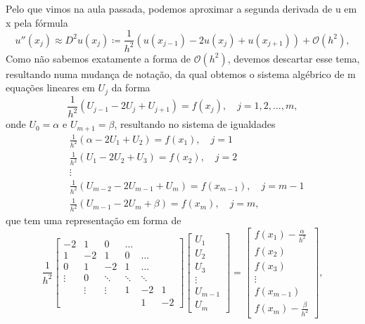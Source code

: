 \documentclass[../differential_methods.tex]{subfiles}
\begin{document}
Pelo que vimos na aula passada, podemos aproximar a segunda derivada de u em x pela fórmula
\[
	u''(x_{j})\approx D^{2}u(x_{j})\coloneqq \frac{1}{h^{2}}(u(x_{j-1})-2u(x_{j})+u(x_{j+1})) + \mathcal{O}(h^{2}),
\]
Como não sabemos exatamente a forma de \(\mathcal{O}(h^{2})\), devemos descartar esse tema, resultando numa mudança de notação, da qual obtemos o sistema algébrico de m equações lineares em \(U_{j}\) da forma
\[
	\frac{1}{h^{2}}(U_{j-1}-2U_{j}+U_{j+1})=f(x_{j}),\quad j=1,2,\dotsc ,m,
\]
onde \(U_{0}=\alpha \) e \(U_{m+1}=\beta \), resultando no sistema de igualdades
\begin{align*}
	 & \frac{1}{h^{2}}(\alpha -2U_1+U_2)=f(x_1), \quad j=1            \\
	 & \frac{1}{h^{2}}(U_1-2U_2+U_3)=f(x_2), \quad j=2                \\
	 & \vdots                                                         \\
	 & \frac{1}{h^{2}}(U_{m-2} -2U_{m-1}+U_m)=f(x_{m-1}), \quad j=m-1 \\
	 & \frac{1}{h^{2}}(U_{m-1} -2U_m+\beta )=f(x_m), \quad j=m,
\end{align*}
que tem uma representação em forma de
\[
	\frac{1}{h^{2}}\begin{bmatrix}
		-2     & 1      & 0      & \dotsc &        &    \\
		1      & -2     & 1      & 0      & \dotsc &    \\
		0      & 1      & -2     & 1      & \dotsc &    \\
		\vdots & 0      & \ddots & \ddots & \ddots &    \\
		       & \vdots & \vdots & 1      & -2     & 1  \\
		       &        &        &        & 1      & -2
	\end{bmatrix} \begin{bmatrix}
		U_1     \\
		U_2     \\
		U_3     \\
		\vdots  \\
		U_{m-1} \\
		U_{m}
	\end{bmatrix} = \begin{bmatrix}
		f(x_1)-\frac{\alpha }{h^{2}} \\
		f(x_2)                       \\
		f(x_3)                       \\
		\vdots                       \\
		f(x_{m-1})                   \\
		f(x_{m})-\frac{\beta }{h^{2}}
	\end{bmatrix},
\]
\end{document}

